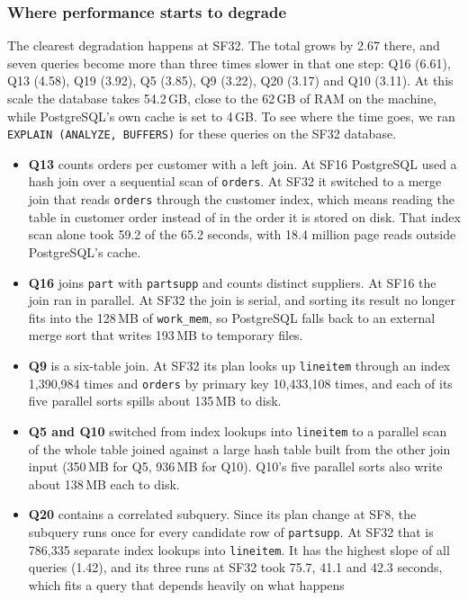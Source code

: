 \documentclass[11pt,a4paper]{article}
\newcommand{\file}[1]{\texttt{#1}}
\begin{document}
\subsubsection*{Where performance starts to degrade}

The clearest degradation happens at SF32. The total grows by 2.67 there, and
seven queries become more than three times slower in that one step: Q16
(6.61), Q13 (4.58), Q19 (3.92), Q5 (3.85), Q9 (3.22), Q20 (3.17) and Q10
(3.11). At this scale the database takes 54.2\,GB, close to the 62\,GB of RAM
on the machine, while PostgreSQL's own cache is set to 4\,GB. To see where the
time goes, we ran \file{EXPLAIN (ANALYZE, BUFFERS)} for these queries on the
SF32 database.

\begin{itemize}
\item \textbf{Q13} counts orders per customer with a left join. At SF16
PostgreSQL used a hash join over a sequential scan of \file{orders}. At SF32
it switched to a merge join that reads \file{orders} through the customer
index, which means reading the table in customer order instead of in the
order it is stored on disk. That index scan alone took 59.2 of the 65.2
seconds, with 18.4 million page reads outside PostgreSQL's cache.
\item \textbf{Q16} joins \file{part} with \file{partsupp} and counts distinct
suppliers. At SF16 the join ran in parallel. At SF32 the join is serial, and
sorting its result no longer fits into the 128\,MB of \file{work\_mem}, so
PostgreSQL falls back to an external merge sort that writes 193\,MB to
temporary files.
\item \textbf{Q9} is a six-table join. At SF32 its plan looks up
\file{lineitem} through an index 1{,}390{,}984 times and \file{orders} by
primary key 10{,}433{,}108 times, and each of its five parallel sorts spills
about 135\,MB to disk.
\item \textbf{Q5 and Q10} switched from index lookups into \file{lineitem} to
a parallel scan of the whole table joined against a large hash table built
from the other join input (350\,MB for Q5, 936\,MB for Q10). Q10's five
parallel sorts also write about 138\,MB each to disk.
\item \textbf{Q20} contains a correlated subquery. Since its plan change at
SF8, the subquery runs once for every candidate row of \file{partsupp}. At
SF32 that is 786{,}335 separate index lookups into \file{lineitem}. It has the
highest slope of all queries (1.42), and its three runs at SF32 took 75.7,
41.1 and 42.3 seconds, which fits a query that depends heavily on what happens

\end{itemize}
\end{document}
